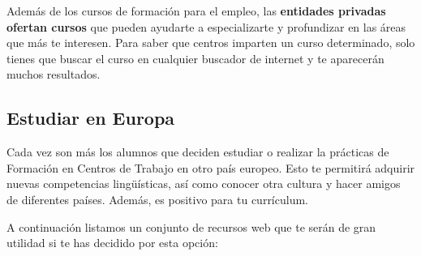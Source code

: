 Además de los cursos de formación para el empleo, las \textbf{entidades privadas ofertan cursos} que pueden ayudarte a especializarte y profundizar en las áreas que más te interesen. Para saber que centros imparten un curso determinado, solo tienes que buscar el curso en cualquier buscador de internet y te aparecerán muchos resultados.

\subsection{Estudiar en Europa}
Cada vez son más los alumnos que deciden estudiar o realizar la prácticas de Formación en Centros de Trabajo en otro país europeo. Esto te permitirá adquirir nuevas competencias lingüísticas, así como conocer otra cultura y hacer amigos de diferentes países. Además, es positivo para tu currículum.

A continuación listamos un conjunto de recursos web que te serán de gran utilidad si te has decidido por esta opción:

